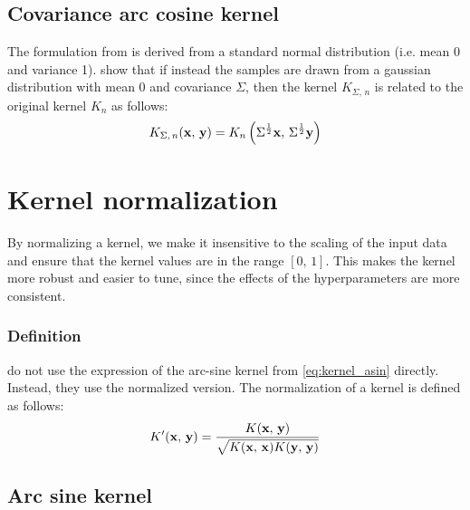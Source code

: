 \subsection{Covariance arc cosine kernel}%
\label{sub:covariance_acos}

The formulation from \textcite{choLargemarginClassificationInfinite2010} is
derived from a standard normal distribution (i.e. mean 0 and variance 1).
\Textcite{pandeyGoDeepWide2014} show that if instead the samples are drawn from
a gaussian distribution with mean 0 and covariance $\Sigma$, then the kernel
$K_{\Sigma,\,n}$ is related to the original kernel $K_{n}$ as follows:
\begin{equation}\label{eq:kernel_pandey}
    K_{\Sigma,\,n}(\mathbf{x},\,\mathbf{y}) = K_{n}\left(\Sigma^{\frac{1}{2}}\mathbf{x},\,\Sigma^{\frac{1}{2}}\mathbf{y}\right)
\end{equation}


\section{Kernel normalization}%
\label{sec:kernel_normalization}

By normalizing a kernel, we make it insensitive to the scaling of the input
data and ensure that the kernel values are in the range $[0,\,1]$. This makes
the kernel more robust and easier to tune, since the effects of the
hyperparameters are more consistent.

\subsubsection{Definition}

\Textcite{frenayParameterinsensitiveKernelExtreme2011} do not use the expression
of the arc-sine kernel from \cref{eq:kernel_asin} directly. Instead, they use
the normalized version. The normalization of a kernel is defined as follows:
\begin{equation}\label{eq:kernel_normalization}
    K'(\mathbf{x},\,\mathbf{y}) = \frac{K(\mathbf{x},\,\mathbf{y})}{\sqrt{K(\mathbf{x},\,\mathbf{x})K(\mathbf{y},\,\mathbf{y})}}
\end{equation}

\subsection{Arc sine kernel}

